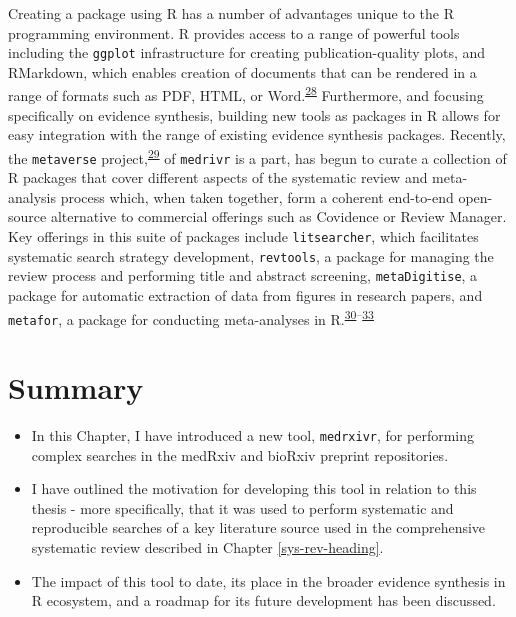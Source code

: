 \documentclass[a4paper, twoside]{templates/ociamthesis}
\begin{document}
Creating a package using R has a number of advantages unique to the R programming environment. R provides access to a range of powerful tools including the \texttt{ggplot} infrastructure for creating publication-quality plots, and RMarkdown, which enables creation of documents that can be rendered in a range of formats such as PDF, HTML, or Word.\textsuperscript{\protect\hyperlink{ref-xie2018r}{28}} Furthermore, and focusing specifically on evidence synthesis, building new tools as packages in R allows for easy integration with the range of existing evidence synthesis packages. Recently, the \texttt{metaverse} project,\textsuperscript{\protect\hyperlink{ref-variousauthors2020}{29}} of \texttt{medrivr} is a part, has begun to curate a collection of R packages that cover different aspects of the systematic review and meta-analysis process which, when taken together, form a coherent end-to-end open-source alternative to commercial offerings such as Covidence or Review Manager. Key offerings in this suite of packages include \texttt{litsearcher}, which facilitates systematic search strategy development, \texttt{revtools}, a package for managing the review process and performing title and abstract screening, \texttt{metaDigitise}, a package for automatic extraction of data from figures in research papers, and \texttt{metafor}, a package for conducting meta-analyses in R.\textsuperscript{\protect\hyperlink{ref-grames2019automated}{30}--\protect\hyperlink{ref-westgate2019revtools}{33}}

\hypertarget{summary-2}{%
\section{Summary}\label{summary-2}}

\begin{itemize}
\item
  In this Chapter, I have introduced a new tool, \texttt{medrxivr}, for performing complex searches in the medRxiv and bioRxiv preprint repositories.
\item
  I have outlined the motivation for developing this tool in relation to this thesis - more specifically, that it was used to perform systematic and reproducible searches of a key literature source used in the comprehensive systematic review described in Chapter \ref{sys-rev-heading}.
\item
  The impact of this tool to date, its place in the broader evidence synthesis in R ecosystem, and a roadmap for its future development has been discussed.
\end{itemize}
\end{document}
